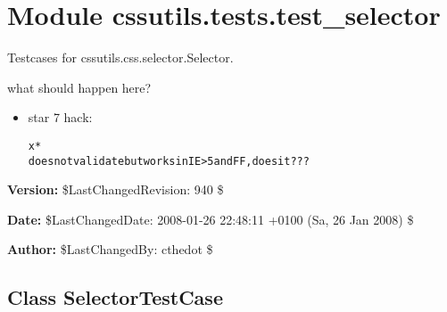 %
%
%


\section{Module cssutils.tests.test\_selector}

    \label{cssutils:tests:test_selector}
Testcases for cssutils.css.selector.Selector.

what should happen here?

\begin{itemize}
\setlength{\parskip}{0.6ex}
  \item star 7 hack:

\begin{alltt}
   x*
   does not validate but works in IE{\textgreater}5 and FF, does it???\end{alltt}

\end{itemize}

\textbf{Version:} \$LastChangedRevision: 940 \$



\textbf{Date:} \$LastChangedDate: 2008-01-26 22:48:11 +0100 (Sa, 26 Jan 2008) \$



\textbf{Author:} \$LastChangedBy: cthedot \$





\subsection{Class SelectorTestCase}

